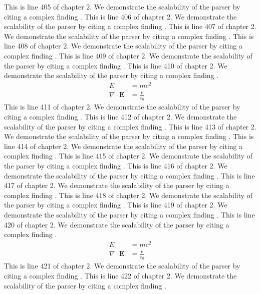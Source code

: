 This is line 405 of chapter 2. We demonstrate the scalability of the parser by citing a complex finding \cite{ref2_405}.
This is line 406 of chapter 2. We demonstrate the scalability of the parser by citing a complex finding \cite{ref2_406}.
This is line 407 of chapter 2. We demonstrate the scalability of the parser by citing a complex finding \cite{ref2_407}.
This is line 408 of chapter 2. We demonstrate the scalability of the parser by citing a complex finding \cite{ref2_408}.
This is line 409 of chapter 2. We demonstrate the scalability of the parser by citing a complex finding \cite{ref2_409}.
This is line 410 of chapter 2. We demonstrate the scalability of the parser by citing a complex finding \cite{ref2_410}.
\begin{align*}
  E &= mc^2 \\
  \nabla \cdot \mathbf{E} &= \frac{\rho}{\varepsilon_0}
\end{align*}
This is line 411 of chapter 2. We demonstrate the scalability of the parser by citing a complex finding \cite{ref2_411}.
This is line 412 of chapter 2. We demonstrate the scalability of the parser by citing a complex finding \cite{ref2_412}.
This is line 413 of chapter 2. We demonstrate the scalability of the parser by citing a complex finding \cite{ref2_413}.
This is line 414 of chapter 2. We demonstrate the scalability of the parser by citing a complex finding \cite{ref2_414}.
This is line 415 of chapter 2. We demonstrate the scalability of the parser by citing a complex finding \cite{ref2_415}.
This is line 416 of chapter 2. We demonstrate the scalability of the parser by citing a complex finding \cite{ref2_416}.
This is line 417 of chapter 2. We demonstrate the scalability of the parser by citing a complex finding \cite{ref2_417}.
This is line 418 of chapter 2. We demonstrate the scalability of the parser by citing a complex finding \cite{ref2_418}.
This is line 419 of chapter 2. We demonstrate the scalability of the parser by citing a complex finding \cite{ref2_419}.
This is line 420 of chapter 2. We demonstrate the scalability of the parser by citing a complex finding \cite{ref2_420}.
\begin{align*}
  E &= mc^2 \\
  \nabla \cdot \mathbf{E} &= \frac{\rho}{\varepsilon_0}
\end{align*}
This is line 421 of chapter 2. We demonstrate the scalability of the parser by citing a complex finding \cite{ref2_421}.
This is line 422 of chapter 2. We demonstrate the scalability of the parser by citing a complex finding \cite{ref2_422}.

